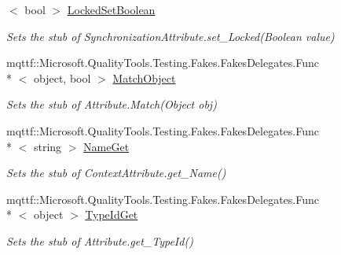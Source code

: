 \begin{DoxyCompactItemize}
$<$ bool $>$ \hyperlink{class_system_1_1_runtime_1_1_remoting_1_1_contexts_1_1_fakes_1_1_stub_synchronization_attribute_ad884426f163afa8de6627a9c00c5677f}{Locked\-Set\-Boolean}
\begin{DoxyCompactList}\small\item\em Sets the stub of Synchronization\-Attribute.\-set\-\_\-\-Locked(\-Boolean value)\end{DoxyCompactList}\item 
mqttf\-::\-Microsoft.\-Quality\-Tools.\-Testing.\-Fakes.\-Fakes\-Delegates.\-Func\\*
$<$ object, bool $>$ \hyperlink{class_system_1_1_runtime_1_1_remoting_1_1_contexts_1_1_fakes_1_1_stub_synchronization_attribute_accb0801c7d92f292ee2ce2e6dd7d39b8}{Match\-Object}
\begin{DoxyCompactList}\small\item\em Sets the stub of Attribute.\-Match(\-Object obj)\end{DoxyCompactList}\item 
mqttf\-::\-Microsoft.\-Quality\-Tools.\-Testing.\-Fakes.\-Fakes\-Delegates.\-Func\\*
$<$ string $>$ \hyperlink{class_system_1_1_runtime_1_1_remoting_1_1_contexts_1_1_fakes_1_1_stub_synchronization_attribute_ab0a2defe962533d6d4fb6b7e44cdbd8d}{Name\-Get}
\begin{DoxyCompactList}\small\item\em Sets the stub of Context\-Attribute.\-get\-\_\-\-Name()\end{DoxyCompactList}\item 
mqttf\-::\-Microsoft.\-Quality\-Tools.\-Testing.\-Fakes.\-Fakes\-Delegates.\-Func\\*
$<$ object $>$ \hyperlink{class_system_1_1_runtime_1_1_remoting_1_1_contexts_1_1_fakes_1_1_stub_synchronization_attribute_a83a9017cd36cc0a8620939f6e2dcc2cd}{Type\-Id\-Get}
\begin{DoxyCompactList}\small\item\em Sets the stub of Attribute.\-get\-\_\-\-Type\-Id()\end{DoxyCompactList}\end{DoxyCompactItemize}
